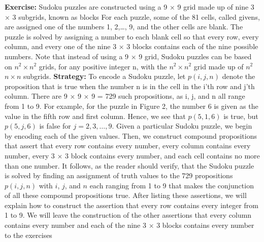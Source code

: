 \begin{tcolorbox}[title=Example 2: Sudoku puzzles (1/2)]
\textbf{Exercise:} \newline
Sudoku puzzles are constructed using a 9 × 9 grid made up of nine 3 × 3 subgrids, known as blocks \newline
For each puzzle, some of the 81 cells, called givens,
are assigned one of the numbers 1, 2,…, 9, and the other cells are blank. The puzzle is solved
by assigning a number to each blank cell so that every row, every column, and every one of the
nine 3 × 3 blocks contains each of the nine possible numbers.
\newline Note that instead of using a 9 × 9
grid, Sudoku puzzles can be based on $n^2 \times n^2$ grids, for any positive integer n, with the $n^2 \times n^2$ 
grid made up of $n^2$ $n \times n$  subgrids.
\newline \newline
\textbf{Strategy:} \newline 
To encode a Sudoku puzzle, let $p(i, j, n)$ denote the proposition that is true when the number
n is in the cell in the i'th row and j'th column. There are 9 × 9 × 9 = 729 such propositions, as i,
j, and n all range from 1 to 9. For example, for the puzzle in Figure 2, the number 6 is given as
the value in the fifth row and first column. Hence, we see that $p(5, 1, 6)$ is true, but $p(5, j, 6)$ is
false for $j = 2, 3,\ldots, 9$.
\newline 
\newline
Given a particular Sudoku puzzle, we begin by encoding each of the given values. Then,
we construct compound propositions that assert that every row contains every number, every
column contains every number, every 3 × 3 block contains every number, and each cell contains
no more than one number. \newline It follows, as the reader should verify, that the Sudoku puzzle is solved
by finding an assignment of truth values to the 729 propositions $p(i, j, n)$ with $i$, $j$, and $n$ each
ranging from 1 to 9 that makes the conjunction of all these compound propositions true. \newline After
listing these assertions, we will explain how to construct the assertion that every row contains
every integer from 1 to 9. \newline We will leave the construction of the other assertions that every
column contains every number and each of the nine 3 × 3 blocks contains every number to the
exercises
\end{tcolorbox}

